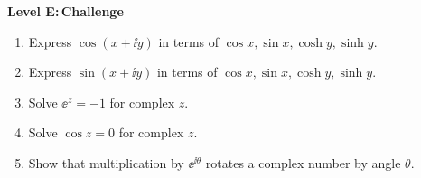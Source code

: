 \documentclass{otscience}
\begin{document}
\begin{practicebox}
\textbf{Level E:\,Challenge}
\begin{enumerate}
\item Express \(\cos(x+\ii y)\) in terms of \(\cos x,\sin x,\cosh y,\sinh y\).
\item Express \(\sin(x+\ii y)\) in terms of \(\cos x,\sin x,\cosh y,\sinh y\).
\item Solve \(\ee^z=-1\) for complex \(z\).
\item Solve \(\cos z=0\) for complex \(z\).
\item Show that multiplication by \(\ee^{\ii\theta}\) rotates a complex number by angle \(\theta\).
\end{enumerate}
\end{practicebox}

\ifdefined\OTCOMBINED%
\else
\end{document}
